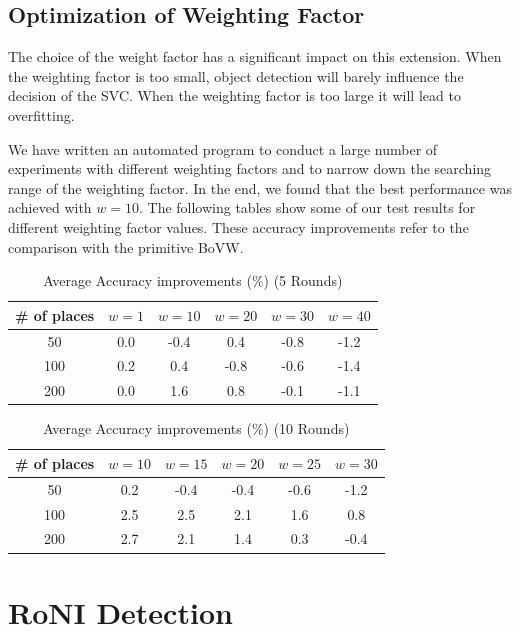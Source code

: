 \documentclass[conference]{IEEEtran}
\begin{document}
\subsection{Optimization of Weighting Factor}

The choice of the weight factor has a significant impact on this extension. When the weighting factor is too small, object detection will barely influence the decision of the SVC. When the weighting factor is too large it will lead to overfitting.

We have written an automated program to conduct a large number of experiments with different weighting factors and to narrow down the searching range of the weighting factor. In the end, we found that the best performance was achieved with $w = 10$. The following tables show some of our test results for different weighting factor values. These accuracy improvements refer to the comparison with the primitive BoVW.

\begin{table}[ht]
    \centering
    \caption{Average Accuracy improvements (\%) (5 Rounds)}
    \begin{tabular}{|c|c|c|c|c|c|}
    \hline \textbf{\# of places} & $w = 1$ & $w = 10$ & $w = 20$ & $w = 30$ & $w = 40$\\
    \hline 50 & 0.0 & -0.4 & 0.4 & -0.8 & -1.2\\
    \hline 100 & 0.2 & 0.4 & -0.8 & -0.6 & -1.4\\
    \hline 200 & 0.0 & 1.6 & 0.8 & -0.1 & -1.1\\
    \hline
    \end{tabular}
\end{table}

\begin{table}[ht]
    \centering
    \caption{Average Accuracy improvements (\%) (10 Rounds)}
    \begin{tabular}{|c|c|c|c|c|c|}
    \hline \textbf{\# of places} & $w = 10$ & $w = 15$ & $w = 20$ & $w = 25$ & $w = 30$\\
    \hline 50 & 0.2 & -0.4 & -0.4 & -0.6 & -1.2\\
    \hline 100 & 2.5 & 2.5 & 2.1 & 1.6 & 0.8\\
    \hline 200 & 2.7 & 2.1 & 1.4 & 0.3 & -0.4\\
    \hline
    \end{tabular}
\end{table}

\section{RoNI Detection}
\end{document}
